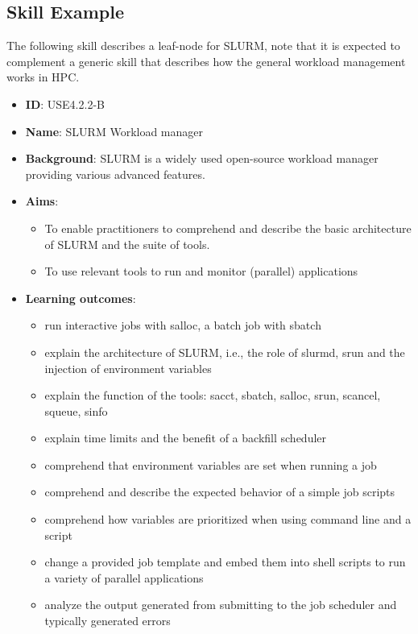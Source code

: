 \documentclass[jocse]{jocseart}
\begin{document}
\subsection{Skill Example}

The following skill describes a leaf-node for SLURM, note that it is expected to complement a generic skill that describes how the general workload management works in HPC.

\begin{itemize}
  \item \textbf{ID}: USE4.2.2-B
  \item \textbf{Name}: SLURM Workload manager
  \item \textbf{Background}: SLURM is a widely used open-source workload manager providing various advanced features.
  \item \textbf{Aims}:
  \begin{itemize}
    \item To enable practitioners to comprehend and describe the basic architecture of SLURM and the suite of tools.
    \item To use relevant tools to run and monitor (parallel) applications
  \end{itemize}
  \item \textbf{Learning outcomes}:
  \begin{itemize}
  \item run interactive jobs with salloc, a batch job with sbatch
  \item explain the architecture of SLURM, i.e., the role of slurmd, srun and the injection of environment variables
  \item explain the function of the tools: sacct, sbatch, salloc, srun, scancel, squeue, sinfo
  \item explain time limits and the benefit of a backfill scheduler
  \item comprehend that environment variables are set when running a job
  \item comprehend and describe the expected behavior of a simple job scripts
  \item comprehend how variables are prioritized when using command line and a script
  \item change a provided job template and embed them into shell scripts to run a variety of parallel applications
  \item analyze the output generated from submitting to the job scheduler and typically generated errors
  \end{itemize}
\end{itemize}
\end{document}
